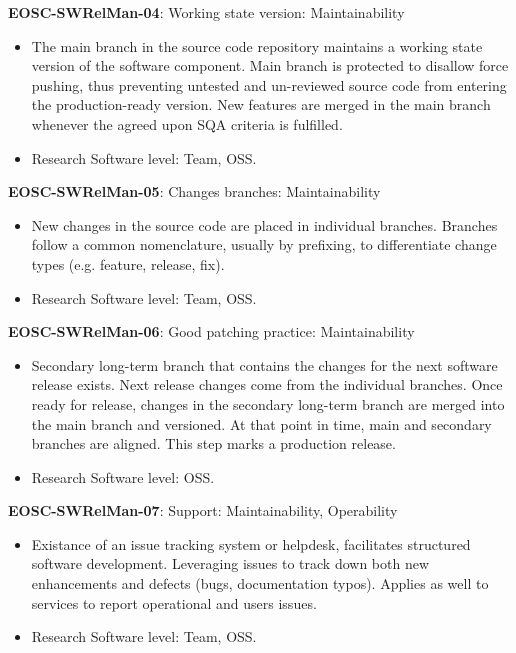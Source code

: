 \textbf{EOSC-SWRelMan-04}: Working state version: Maintainability

\begin{itemize}
    \item The main branch in the source code repository maintains a working state version of the software component. Main branch is protected to disallow force pushing, thus preventing untested and un-reviewed source code from entering the production-ready version. New features are merged in the main branch whenever the agreed upon SQA criteria is fulfilled.~\cite{orviz_set_2017}
    \item Research Software level: Team, OSS.
\end{itemize}

\textbf{EOSC-SWRelMan-05}: Changes branches: Maintainability

\begin{itemize}
    \item New changes in the source code are placed in individual branches. Branches follow a common nomenclature, usually by prefixing, to differentiate change types (e.g. feature, release, fix).~\cite{orviz_set_2017}
    \item Research Software level: Team, OSS.
\end{itemize}

\textbf{EOSC-SWRelMan-06}: Good patching practice: Maintainability

\begin{itemize}
    \item Secondary long-term branch that contains the changes for the next software release exists. Next release changes come from the individual branches. Once ready for release, changes in the secondary long-term branch are merged into the main branch and versioned. At that point in time, main and secondary branches are aligned. This step marks a production release.~\cite{orviz_set_2017,raymond_software_2013}
    \item Research Software level: OSS.
\end{itemize}

\textbf{EOSC-SWRelMan-07}: Support: Maintainability, Operability

\begin{itemize}
    \item Existance of an issue tracking system or helpdesk, facilitates structured software development. Leveraging issues to track down both new enhancements and defects (bugs, documentation typos). Applies as well to services to report operational and users issues.~\cite{srisopha_software_2018,shepherdson_cessda_2019,orviz_set_2017,orviz_fernandez_eosc-synergy_2020}
    \item Research Software level: Team, OSS.
\end{itemize}

